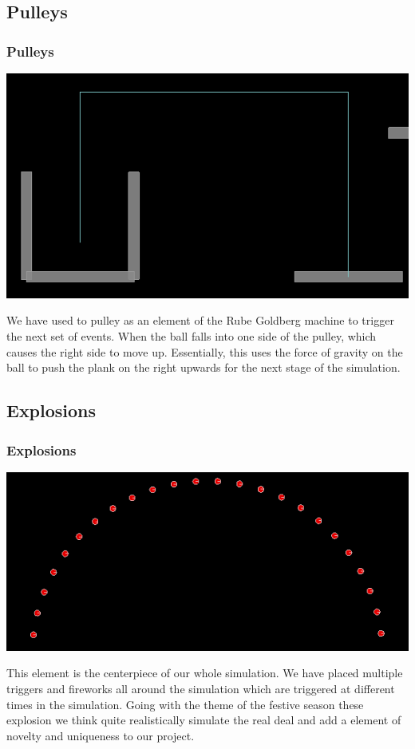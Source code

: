 \subsection{Pulleys}
\begin{frame}
  \frametitle{Pulleys}
  \begin{center}
  \includegraphics[scale=0.25]{./Images/Pulley.png}
  \end{center}
We have used to pulley as an element of the Rube Goldberg machine to trigger the next set of events. When the ball falls into one side of the pulley, which causes the right side to move up. Essentially, this uses the force of gravity on the ball to push the plank on the right upwards for the next stage of the simulation.
\end{frame}


\subsection{Explosions}
\begin{frame}
  \frametitle{Explosions}
  \begin{center}
  \includegraphics[scale = 0.25]{./Images/Explosion00.png}
  \end{center}
  This element is the centerpiece of our whole simulation. We have placed multiple triggers and fireworks all around the simulation
which are triggered at different times in the simulation. Going with the theme of the festive season these explosion we think quite 
realistically simulate the real deal and add a element of novelty and uniqueness to our project.
\end{frame} 


